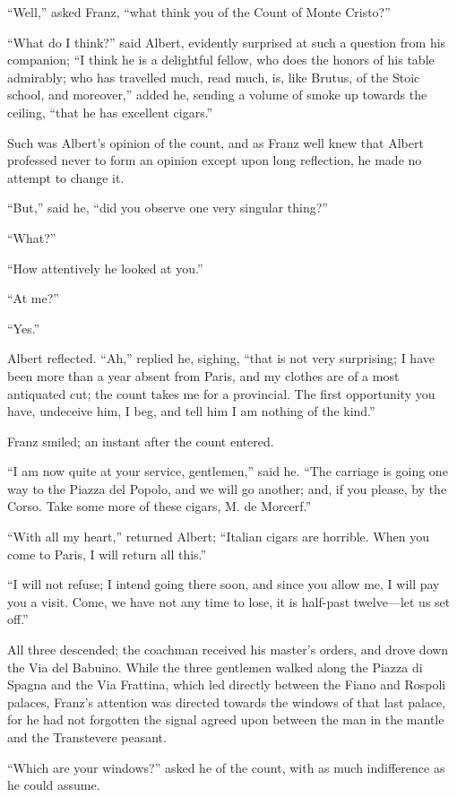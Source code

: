 “Well,” asked Franz, “what think you of the Count of Monte Cristo?”

“What do I think?” said Albert, evidently surprised at such a question
from his companion; “I think he is a delightful fellow, who does the
honors of his table admirably; who has travelled much, read much, is,
like Brutus, of the Stoic school, and moreover,” added he, sending a
volume of smoke up towards the ceiling, “that he has excellent cigars.”

Such was Albert’s opinion of the count, and as Franz well knew that
Albert professed never to form an opinion except upon long reflection,
he made no attempt to change it.

“But,” said he, “did you observe one very singular thing?”

“What?”

“How attentively he looked at you.”

“At me?”

“Yes.”

Albert reflected. “Ah,” replied he, sighing, “that is not very
surprising; I have been more than a year absent from Paris, and my
clothes are of a most antiquated cut; the count takes me for a
provincial. The first opportunity you have, undeceive him, I beg, and
tell him I am nothing of the kind.”

Franz smiled; an instant after the count entered.

“I am now quite at your service, gentlemen,” said he. “The carriage is
going one way to the Piazza del Popolo, and we will go another; and, if
you please, by the Corso. Take some more of these cigars, M. de
Morcerf.”

“With all my heart,” returned Albert; “Italian cigars are horrible.
When you come to Paris, I will return all this.”

“I will not refuse; I intend going there soon, and since you allow me,
I will pay you a visit. Come, we have not any time to lose, it is
half-past twelve—let us set off.”

All three descended; the coachman received his master’s orders, and
drove down the Via del Babuino. While the three gentlemen walked along
the Piazza di Spagna and the Via Frattina, which led directly between
the Fiano and Rospoli palaces, Franz’s attention was directed towards
the windows of that last palace, for he had not forgotten the signal
agreed upon between the man in the mantle and the Transtevere peasant.

“Which are your windows?” asked he of the count, with as much
indifference as he could assume.

